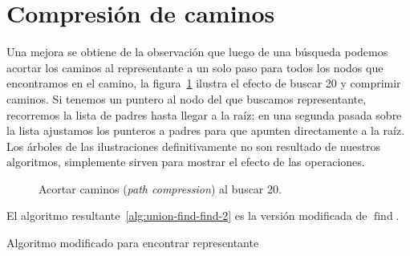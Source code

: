 \section{Compresión de caminos}
\label{sec:union-find-path-compression}

  Una mejora se obtiene de la observación
  que luego de una búsqueda podemos acortar los caminos al representante
  a un solo paso
  para todos los nodos que encontramos en el camino,
  la figura~\ref{fig:union-find-path-compression}
  ilustra el efecto de buscar \num{20} y comprimir caminos.
  Si tenemos un puntero al nodo del que buscamos representante,
  recorremos la lista de padres hasta llegar a la raíz;
  en una segunda pasada sobre la lista ajustamos los punteros a padres
  para que apunten directamente a la raíz.
  Los árboles de las ilustraciones
  definitivamente no son resultado de nuestros algoritmos,
  simplemente sirven para mostrar el efecto de las operaciones.
  \begin{figure}[ht]
    \centering
    \caption{Acortar caminos
             (\emph{\foreignlanguage{english}{path compression}})
             al buscar \num{20}.}
    \label{fig:union-find-path-compression}
  \end{figure}
  El algoritmo resultante~\ref{alg:union-find-find-2}
  es la versión modificada de \(\operatorname{find}\).
  \begin{algorithm}[ht]
    \DontPrintSemicolon\Indp

    \caption{Algoritmo modificado para encontrar representante}
    \label{alg:union-find-find-2}
  \end{algorithm}
